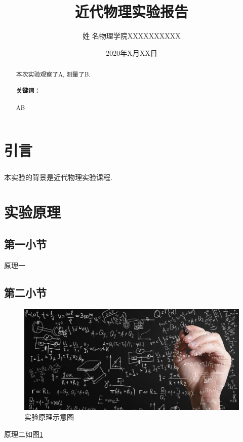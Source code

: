 \documentclass[a4paper,UTF8]{ctexart}
\title{近代物理实验报告}
\author{姓 名\quad 物理学院\quad XXXXXXXXXX}
\date{2020年X月XX日}
\newcommand{\upcite}[1]{\textsuperscript{\textsuperscript{\cite{#1}}}}
\begin{document}
\maketitle

\begin{abstract}
    本次实验观察了A, 测量了B.

    \paragraph{关键词：} A\quad B

\end{abstract}

\section{引言}
本实验的背景是近代物理实验课程.\upcite{textbook}


\section{实验原理}
\subsection{第一小节}
原理一
\subsection{第二小节}
\begin{figure}[H]
    \centering
    \includegraphics[width=0.9\linewidth]{pic/formula.jpg}
    \caption{实验原理示意图}
    \label{fig:form}
\end{figure}
原理二如图\ref{fig:form}
\end{document}
